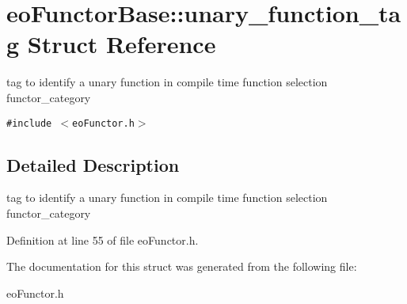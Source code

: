 \section{eo\-Functor\-Base::unary\_\-function\_\-tag Struct Reference}
\label{structeo_functor_base_1_1unary__function__tag}
tag to identify a unary function in compile time function selection functor\_\-category  


{\tt \#include $<$eo\-Functor.h$>$}



\subsection{Detailed Description}
tag to identify a unary function in compile time function selection functor\_\-category 



Definition at line 55 of file eo\-Functor.h.

The documentation for this struct was generated from the following file:\begin{CompactItemize}
\item 
eo\-Functor.h\end{CompactItemize}
